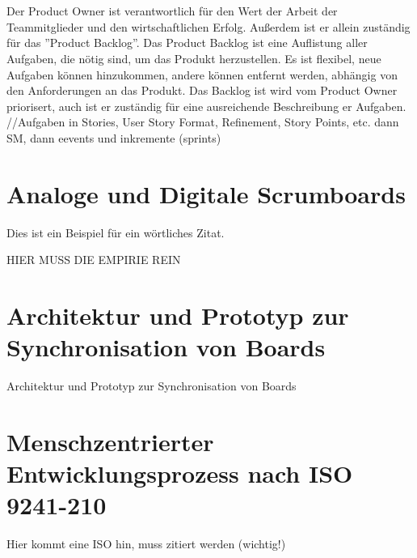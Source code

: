 \\\\
Der Product Owner ist verantwortlich für den Wert der Arbeit der Teammitglieder und den wirtschaftlichen Erfolg. Außerdem ist er allein zuständig für das ''Product Backlog''. Das Product Backlog ist eine Auflistung aller Aufgaben, die nötig sind, um das Produkt herzustellen. Es ist flexibel, neue Aufgaben können hinzukommen, andere können entfernt werden, abhängig von den Anforderungen an das Produkt. Das Backlog ist wird vom Product Owner priorisert, auch ist er zuständig für eine ausreichende Beschreibung er Aufgaben.
 //Aufgaben in Stories, User Story Format, Refinement, Story Points, etc. dann SM, dann eevents und inkremente (sprints)

\section{Analoge und Digitale Scrumboards}
\label{sec:digitale_analoge_boards}
Dies ist ein Beispiel für ein wörtliches Zitat.

HIER MUSS DIE EMPIRIE REIN

\section{Architektur und Prototyp zur Synchronisation von Boards}
\label{sec:architektur_prototyp_sync}

Architektur und Prototyp zur Synchronisation von Boards

\section{Menschzentrierter Entwicklungsprozess nach ISO 9241-210}
\label{sec:menschzentrierte_entwicklung_iso9241}

Hier kommt eine ISO hin, muss zitiert werden (wichtig!)
